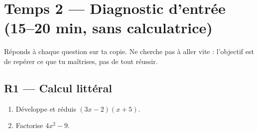 
\section*{Temps 2 — Diagnostic d'entrée \hfill
\normalfont\small(15–20 min, sans calculatrice)}

Réponds à chaque question sur ta copie. Ne cherche pas à aller vite : l'objectif est de repérer ce que tu maîtrises, pas de tout réussir.

\bigskip

\subsection*{R1 — Calcul littéral}

\begin{enumerate}

  \item Développe et réduis $(3x - 2)(x + 5)$.

  \item Factorise $4x^2 - 9$.

\end{enumerate}

